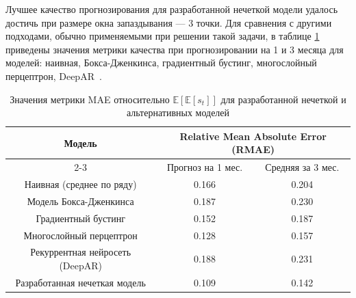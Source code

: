 
Лучшее качество прогнозирования для разработанной нечеткой модели удалось достичь при размере окна запаздывания --- 3 точки. Для сравнения с другими подходами, обычно применяемыми при решении такой задачи, в таблице \ref{tab:acquiring-metric-comparison} приведены значения метрики качества при прогнозировании на 1 и 3 месяца для моделей: наивная, Бокса-Дженкинса, градиентный бустинг, многослойный перцептрон, DeepAR~\cite{Green2015, BoxJenkins2015, Prokhorenkova2018CatBoost, Rumelhart1986Backprop, Salinas2020DeepAR}.

\begin{table}[t]
	\centering
	\begin{threeparttable}%
		\caption{Значения метрики MAE относительно $\mathbb{E}[\mathbb{E}[s_t]]$ для разработанной нечеткой и альтернативных моделей}%
		\label{tab:acquiring-metric-comparison}%
		\begin{tabular}{| c | c | c |}
			\toprule
			\multirow{2}{*}{Модель} & \multicolumn{2}{|c|}{Relative Mean Absolute Error (RMAE)} \\
			\cmidrule{2-3} & Прогноз на 1 мес. & Средняя за 3 мес. \\
			\midrule
			Наивная (среднее по ряду) & 0.166 & 0.204 \\
			Модель Бокса-Дженкинса & 0.187 & 0.230  \\
			Градиентный бустинг & 0.152  & 0.187 \\
			Многослойный перцептрон & 0.128 & 0.157  \\
			Рекуррентная нейросеть (DeepAR) & 0.188	 & 0.231 \\
			\midrule
			Разработанная нечеткая модель & 0.109  & 0.142  \\ %
			\bottomrule
		\end{tabular}%
	\end{threeparttable}
\end{table}

